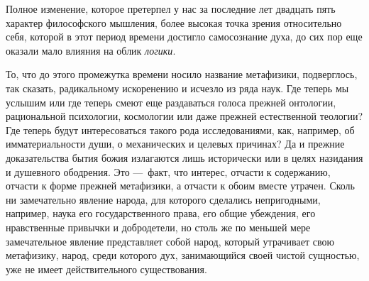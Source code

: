 Полное изменение, которое претерпел у нас за
последние лет двадцать пять характер философского мышления, более высокая
точка зрения относительно себя, которой в этот период времени достигло
самосознание духа, до сих пор еще оказали мало влияния на облик
{\em логики}.

То, что до этого промежутка времени носило название метафизики, подверглось,
так сказать, радикальному искоренению и исчезло из ряда наук. Где теперь мы
услышим или где теперь смеют еще раздаваться голоса прежней онтологии,
рациональной психологии, космологии или даже прежней естественной теологии?
Где теперь будут интересоваться такого рода исследованиями, как, например,
об имматериальности души, о механических и целевых причинах? Да и прежние
доказательства бытия божия излагаются лишь исторически или в целях
назидания и душевного ободрения. Это —~факт, что интерес, отчасти к
содержанию, отчасти к форме прежней метафизики, а отчасти к обоим вместе
утрачен. Сколь ни замечательно явление народа, для которого сделались
непригодными, например, наука его государственного права, его общие
убеждения, его нравственные привычки и добродетели, но столь же по меньшей
мере замечательное явление представляет собой народ, который утрачивает
свою метафизику, народ, среди которого дух, занимающийся своей чистой
сущностью, уже не имеет действительного существования.

